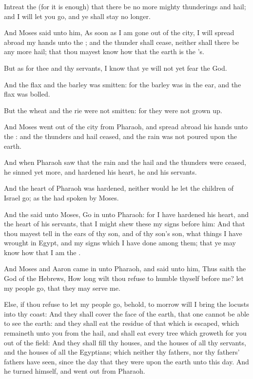 \Verse Intreat the \LORD (for it is enough) that there be no more mighty thunderings and hail; and I will let you go, and ye shall stay no longer.

\Verse And Moses said unto him, As soon as I am gone out of the city, I will spread abroad my hands unto the \LORD; and the thunder shall cease, neither shall there be any more hail; that thou mayest know how that the earth is the \LORD's.

\Verse But as for thee and thy servants, I know that ye will not yet fear the \LORD God.

\Verse And the flax and the barley was smitten: for the barley was in the ear, and the flax was bolled.

\Verse But the wheat and the rie were not smitten: for they were not grown up.

\Verse And Moses went out of the city from Pharaoh, and spread abroad his hands unto the \LORD: and the thunders and hail ceased, and the rain was not poured upon the earth.

\Verse And when Pharaoh saw that the rain and the hail and the thunders were ceased, he sinned yet more, and hardened his heart, he and his servants.

\Verse And the heart of Pharaoh was hardened, neither would he let the children of Israel go; as the \LORD had spoken by Moses.

\Chapter
\Verse And the \LORD said unto Moses, Go in unto Pharaoh: for I have hardened his heart, and the heart of his servants, that I might shew these my signs before him: \Verse And that thou mayest tell in the ears of thy son, and of thy son's son, what things I have wrought in Egypt, and my signs which I have done among them; that ye may know how that I am the \LORD.

\Verse And Moses and Aaron came in unto Pharaoh, and said unto him, Thus saith the \LORD God of the Hebrews, How long wilt thou refuse to humble thyself before me? let my people go, that they may serve me.

\Verse Else, if thou refuse to let my people go, behold, to morrow will I bring the locusts into thy coast: \Verse And they shall cover the face of the earth, that one cannot be able to see the earth: and they shall eat the residue of that which is escaped, which remaineth unto you from the hail, and shall eat every tree which groweth for you out of the field: \Verse And they shall fill thy houses, and the houses of all thy servants, and the houses of all the Egyptians; which neither thy fathers, nor thy fathers' fathers have seen, since the day that they were upon the earth unto this day. And he turned himself, and went out from Pharaoh.

